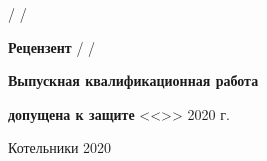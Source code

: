 \begin{titlepage}
\begin{flushleft}
\hspace{154pt}
\hrulefill
\hspace{5pt}
/
\hspace{2pt}
\hrulefill
\hspace{2pt}
/

\textbf{Рецензент}
\hspace{85pt}
\hrulefill
\hspace{5pt}
/
\hspace{2pt}
\hrulefill
\hspace{2pt}
/



\textbf{Выпускная квалификационная работа}

\textbf{допущена к защите}
\hfill \hfill
<<\underline{\hspace{0.8cm}}>>
\underline{\hspace{3cm}} 2020 г.


\end{flushleft}



\vspace{\fill}

\begin{center}
Котельники 2020
\end{center}

\end{titlepage}
    
    